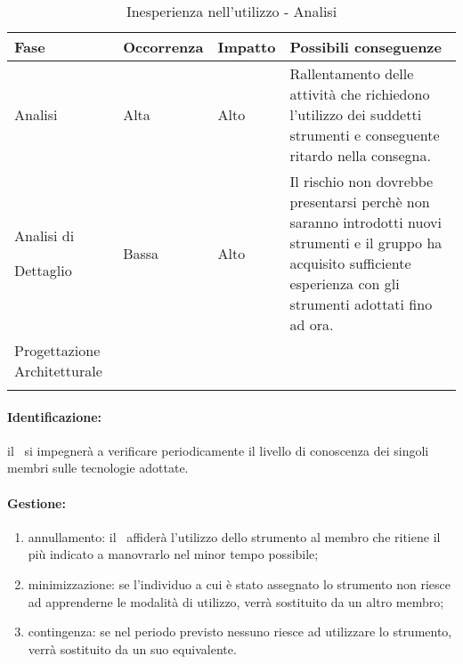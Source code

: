 \documentclass[../PianoProgetto.tex]{subfiles}
\begin{document}

	\begin{table} [h]
		\centering
		\begin{tabularx}{\textwidth}{F O O P}
			\toprule
			\textbf{Fase} & \textbf{Occorrenza} & \textbf{Impatto} & \textbf{Possibili conseguenze}\\
			\midrule
			Analisi & Alta & Alto & Rallentamento delle attività che richiedono l'utilizzo dei suddetti strumenti e conseguente ritardo nella consegna. \\
			\midrule
			Analisi di \par Dettaglio & Bassa & Alto & Il rischio non dovrebbe presentarsi perchè non saranno introdotti nuovi strumenti e il gruppo ha acquisito sufficiente esperienza con gli strumenti adottati fino ad ora. \\
			\midrule
			Progettazione Architetturale & & & \\
			\bottomrule
		\end{tabularx}
		\caption{Inesperienza nell'utilizzo - Analisi}
		\label{tab:Inesperienza nell'utilizzo - Analisi}	
	\end{table}	
	
	\paragraph*{Identificazione:} il \responsabilediprogetto\ si impegnerà a verificare periodicamente il livello di conoscenza dei singoli membri sulle tecnologie adottate.
	
	\paragraph*{Gestione:}
	\begin{enumerate}
		\item annullamento: il \responsabilediprogetto\ affiderà l'utilizzo dello strumento al membro che ritiene il più indicato a manovrarlo nel minor tempo possibile;
		\item minimizzazione: se l'individuo a cui è stato assegnato lo strumento non riesce ad apprenderne le modalità di utilizzo, verrà sostituito da un altro membro;
		\item contingenza: se nel periodo previsto nessuno riesce ad utilizzare lo strumento, verrà sostituito da un suo equivalente. 
	\end{enumerate}		
	
\end{document}
